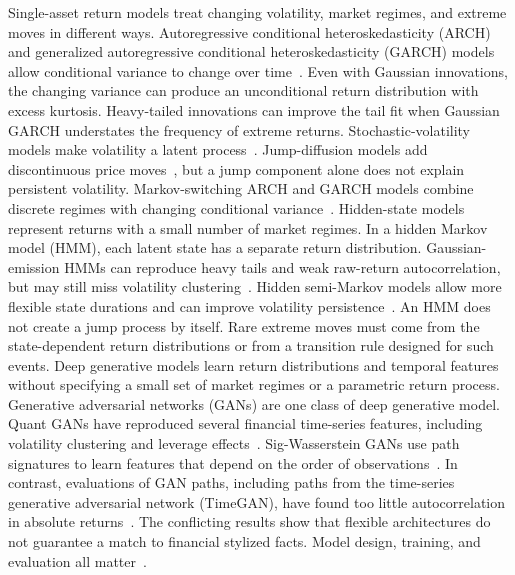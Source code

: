 
Single-asset return models treat changing volatility, market regimes, and
extreme moves in different ways. Autoregressive conditional heteroskedasticity
(ARCH) and generalized autoregressive conditional heteroskedasticity (GARCH)
models allow conditional
variance to change over time~\cite{engle1982,bollerslev1986}. Even with
Gaussian innovations, the changing variance can produce an unconditional
return distribution with excess kurtosis. Heavy-tailed innovations can improve
the tail fit when Gaussian GARCH understates the frequency of extreme returns.
Stochastic-volatility models make volatility a latent
process~\cite{steinStein1991,heston1993,
kimShephardChib1998}. Jump-diffusion models add discontinuous price
moves~\cite{merton1976,kou2002}, but a jump component alone does not explain
persistent volatility. Markov-switching ARCH and GARCH models combine discrete
regimes with changing conditional variance~\cite{hamiltonSusmel1994,
klaassen2002}.
Hidden-state models represent returns with a small number of market regimes.
In a hidden Markov model (HMM), each latent state has a separate return distribution.
Gaussian-emission HMMs can reproduce heavy tails
and weak raw-return autocorrelation, but may still miss volatility
clustering~\cite{hamilton1989,rydenTerasvirtaAsbrink1998}. Hidden semi-Markov
models allow more flexible state durations and can improve volatility
persistence~\cite{bullaBulla2006}. An HMM does not create a jump process by
itself. Rare extreme moves must come from the state-dependent return
distributions or from a transition rule designed for such events.
Deep generative models learn return distributions and temporal features
without specifying a small set of market regimes or a parametric return
process. Generative adversarial networks (GANs) are one class of deep
generative model. Quant GANs have
reproduced several financial time-series features, including volatility
clustering and leverage effects~\cite{wieseEtAl2020}.
Sig-Wasserstein GANs use path signatures to learn features that depend on the
order of observations~\cite{niEtAl2021}. In contrast, evaluations of GAN
paths, including paths from the time-series generative adversarial network
(TimeGAN), have found too little autocorrelation in absolute
returns~\cite{takahashiEtAl2019,yoonEtAl2019timegan,kwonLee2024}. The
conflicting results show that flexible architectures do not guarantee a
match to financial stylized facts. Model design, training, and evaluation all
matter~\cite{assefaEtAl2020,stengerEtAl2024}.

